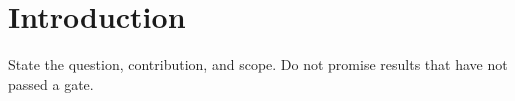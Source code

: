 \section{Introduction}
State the question, contribution, and scope. Do not promise results that have not passed a gate.
